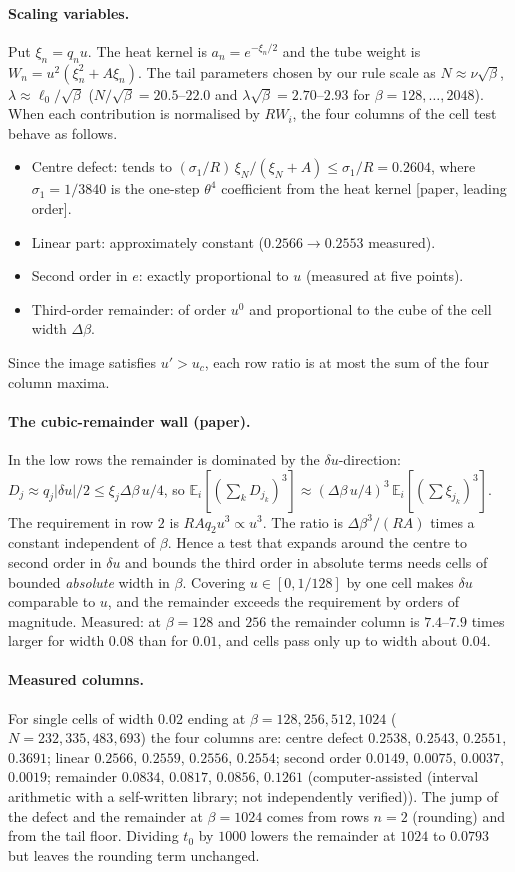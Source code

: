 \documentclass[11pt,a4paper]{article}
\theoremstyle{definition}
\theoremstyle{remark}
\newcommand{\IA}{computer-assisted (interval arithmetic with a self-written library; not independently verified)}
\begin{document}
\paragraph{Scaling variables.}
Put $\xi_n=q_nu$. The heat kernel is $a_n=e^{-\xi_n/2}$ and the tube weight is $W_n=u^2(\xi_n^2+A\xi_n)$.
The tail parameters chosen by our rule scale as $N\approx\nu\sqrt\beta$, $\lambda\approx\ell_0/\sqrt\beta$ ($N/\sqrt\beta=20.5$--$22.0$ and $\lambda\sqrt\beta=2.70$--$2.93$ for $\beta=128,\dots,2048$).
When each contribution is normalised by $RW_i$, the four columns of the cell test behave as follows.
\begin{itemize}[nosep]
\item Centre defect: tends to $(\sigma_1/R)\,\xi_N/(\xi_N+A)\le\sigma_1/R=0.2604$, where $\sigma_1=1/3840$ is the one-step $\theta^4$ coefficient from the heat kernel [paper, leading order].
\item Linear part: approximately constant ($0.2566\to0.2553$ measured).
\item Second order in $e$: exactly proportional to $u$ (measured at five points).
\item Third-order remainder: of order $u^0$ and proportional to the cube of the cell width $\Delta\beta$.
\end{itemize}
Since the image satisfies $u'>u_c$, each row ratio is at most the sum of the four column maxima.

\paragraph{The cubic-remainder wall (paper).}
In the low rows the remainder is dominated by the $\delta u$-direction: $D_j\approx q_j|\delta u|/2\le\xi_j\Delta\beta\,u/4$, so $\mathbb{E}_i[(\sum_kD_{j_k})^3]\approx(\Delta\beta\,u/4)^3\,\mathbb{E}_i[(\sum\xi_{j_k})^3]$.
The requirement in row $2$ is $RAq_2u^3\propto u^3$.
The ratio is $\Delta\beta^3/(RA)$ times a constant independent of $\beta$.
Hence a test that expands around the centre to second order in $\delta u$ and bounds the third order in absolute terms needs cells of bounded \emph{absolute} width in $\beta$.
Covering $u\in[0,1/128]$ by one cell makes $\delta u$ comparable to $u$, and the remainder exceeds the requirement by orders of magnitude.
Measured: at $\beta=128$ and $256$ the remainder column is $7.4$--$7.9$ times larger for width $0.08$ than for $0.01$, and cells pass only up to width about $0.04$.

\paragraph{Measured columns.}
For single cells of width $0.02$ ending at $\beta=128,256,512,1024$ ($N=232,335,483,693$) the four columns are: centre defect $0.2538$, $0.2543$, $0.2551$, $0.3691$; linear $0.2566$, $0.2559$, $0.2556$, $0.2554$; second order $0.0149$, $0.0075$, $0.0037$, $0.0019$; remainder $0.0834$, $0.0817$, $0.0856$, $0.1261$ (\IA).
The jump of the defect and the remainder at $\beta=1024$ comes from rows $n=2$ (rounding) and from the tail floor.
Dividing $t_0$ by $1000$ lowers the remainder at $1024$ to $0.0793$ but leaves the rounding term unchanged.
\end{document}
